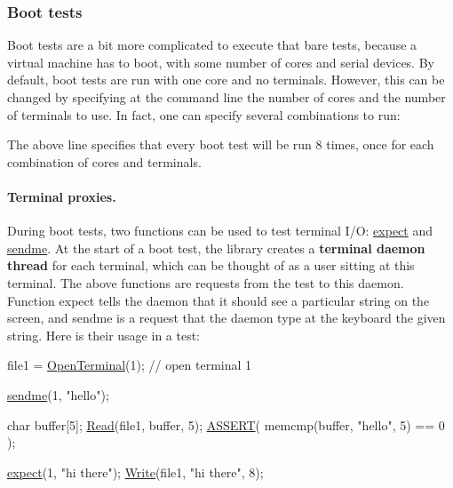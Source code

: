 \subsubsection*{Boot tests }

Boot tests are a bit more complicated to execute that bare tests, because a virtual machine has to boot, with some number of cores and serial devices. By default, boot tests are run with one core and no terminals. However, this can be changed by specifying at the command line the number of cores and the number of terminals to use. In fact, one can specify several combinations to run\+: 
 The above line specifies that every boot test will be run 8 times, once for each combination of cores and terminals.

\paragraph*{Terminal proxies.}

During boot tests, two functions can be used to test terminal I/O\+: \hyperlink{group__Testing_ga0c4e801b8c3317b802fa4e80e1e26de2}{expect} and \hyperlink{group__Testing_ga0f97d30c4cd1370bcac6d7f4775d6789}{sendme}. At the start of a boot test, the library creates a {\bfseries terminal daemon thread} for each terminal, which can be thought of as a user sitting at this terminal. The above functions are requests from the test to this daemon. Function {\ttfamily expect} tells the daemon that it should see a particular string on the screen, and {\ttfamily sendme} is a request that the daemon type at the keyboard the given string. Here is their usage in a test\+: 
\begin{DoxyCode}
file1 = \hyperlink{group__syscalls_ga6ea2b586a8dfcfc1e7065e1664a0fb35}{OpenTerminal}(1);     \textcolor{comment}{// open terminal 1}

\hyperlink{group__Testing_ga0f97d30c4cd1370bcac6d7f4775d6789}{sendme}(1, \textcolor{stringliteral}{"hello"});

\textcolor{keywordtype}{char} buffer[5];
\hyperlink{group__syscalls_ga3e9dc545a789eb45b2d356eabbac3ee3}{Read}(file1, buffer, 5); 
\hyperlink{group__Testing_ga28301f76c53b643912da7c538f74e2c6}{ASSERT}( memcmp(buffer, \textcolor{stringliteral}{"hello"}, 5) == 0 );

\hyperlink{group__Testing_ga0c4e801b8c3317b802fa4e80e1e26de2}{expect}(1, \textcolor{stringliteral}{"hi there"});
\hyperlink{group__syscalls_gaf046f003fde24f79fb395c250137856c}{Write}(file1, \textcolor{stringliteral}{"hi there"}, 8);
\end{DoxyCode}


